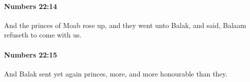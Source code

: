 		\paragraph{Numbers 22:14} %
			\label{NUMBERS-22-14}

			And the princes of Moab rose up, and they went unto Balak, and said, Balaam refuseth to come with us.


		\paragraph{Numbers 22:15} %
			\label{NUMBERS-22-15}

			And Balak sent yet again princes, more, and more honourable than they.


